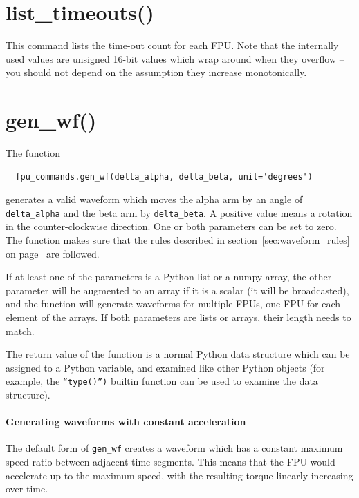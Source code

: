 \documentclass[fontsize=12,a4paper]{scrreprt}
\begin{document}
\section{list\_timeouts()}
 This command lists the time-out count for
each FPU. Note that the internally used values are unsigned 16-bit
values which wrap around when they overflow -- you should not depend
on the assumption they increase monotonically.


\section{gen\_wf()}
\label{sec:genwf}


The function
\begin{verbatim}
  fpu_commands.gen_wf(delta_alpha, delta_beta, unit='degrees')
\end{verbatim}
generates a valid waveform which moves the alpha arm
by an angle of \texttt{delta\_alpha} and the beta arm by
\texttt{delta\_beta}. A positive value means a rotation in the
counter-clockwise direction.  One or both parameters can be set to
zero. The function makes sure that the rules described in
section~\ref{sec:waveform_rules} on page~\pageref{sec:waveform_rules}
are followed.

%
If at least one of the parameters is a Python list or a numpy array,
the other parameter will be augmented to an array if it is a scalar
(it will be broadcasted), and the function will generate waveforms for
multiple FPUs, one FPU for each element of the arrays. If both
parameters are lists or arrays, their length needs to match.

The return value of the function is a normal Python data structure
which can be assigned to a Python variable, and examined like other
Python objects (for example, the \texttt{``type()'')} builtin function
can be used to examine the data structure).

\paragraph{Generating waveforms with constant acceleration}
\label{sec:genwf:constant-acceleration}
The default form of \texttt{gen\_wf} creates a waveform which has
a constant maximum speed ratio between adjacent time segments.
This means that the FPU would accelerate up to the maximum speed,
with the resulting torque linearly increasing over time.
\end{document}
